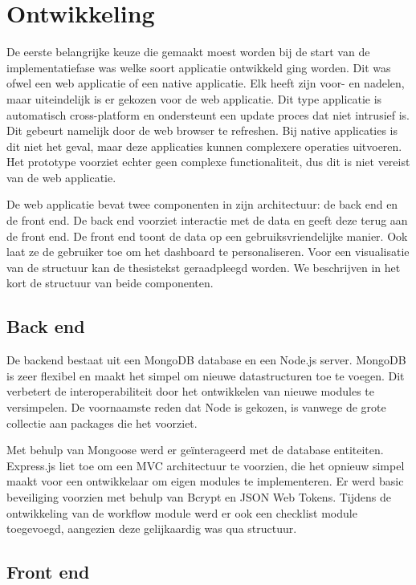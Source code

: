 \documentclass{article}
\begin{document}
\section{Ontwikkeling}

De eerste belangrijke keuze die gemaakt moest worden bij de start van de implementatiefase was welke soort applicatie ontwikkeld ging worden. Dit was ofwel een web applicatie of een native applicatie. Elk heeft zijn voor- en nadelen, maar uiteindelijk is er gekozen voor de web applicatie. Dit type applicatie is automatisch cross-platform en ondersteunt een update proces dat niet intrusief is. Dit gebeurt namelijk door de web browser te refreshen. Bij native applicaties is dit niet het geval, maar deze applicaties kunnen complexere operaties uitvoeren. Het prototype voorziet echter geen complexe functionaliteit, dus dit is niet vereist van de web applicatie.

De web applicatie bevat twee componenten in zijn architectuur: de back end en de front end. De back end voorziet interactie met de data en geeft deze terug aan de front end. De front end toont de data op een gebruiksvriendelijke manier. Ook laat ze de gebruiker toe om het dashboard te personaliseren. Voor een visualisatie van de structuur kan de thesistekst geraadpleegd worden. We beschrijven in het kort de structuur van beide componenten.

    \subsection{Back end}

    De backend bestaat uit een MongoDB database en een Node.js server. MongoDB is zeer flexibel en maakt het simpel om nieuwe datastructuren toe te voegen. Dit verbetert de interoperabiliteit door het ontwikkelen van nieuwe modules te versimpelen. De voornaamste reden dat Node is gekozen, is vanwege de grote collectie aan packages die het voorziet.

    Met behulp van Mongoose werd er ge\"{i}nterageerd met de database entiteiten. Express.js liet toe om een MVC architectuur te voorzien, die het opnieuw simpel maakt voor een ontwikkelaar om eigen modules te implementeren. Er werd basic beveiliging voorzien met behulp van Bcrypt en JSON Web Tokens. Tijdens de ontwikkeling van de workflow module werd er ook een checklist module toegevoegd, aangezien deze gelijkaardig was qua structuur.

    \subsection{Front end}
\end{document}
